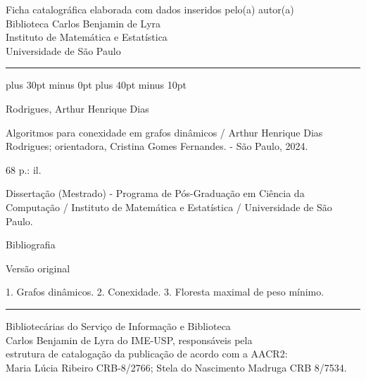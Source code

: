 \begingroup\centering\singlespacing\small
{}
Ficha catalográfica elaborada com dados inseridos pelo(a) autor(a)\\
Biblioteca Carlos Benjamin de Lyra\\
Instituto de Matemática e Estatística\\
Universidade de São Paulo\par
\vspace{2\baselineskip}\hrule\vspace{.8\baselineskip}
\RaggedRightRightskip 0pt plus 30pt minus 0pt\relax
\RaggedRightParfillskip 20pt plus 40pt minus 10pt\relax
\ttfamily\hspace{2em}\begin{minipage}[t]{125mm}
\RaggedRight\sloppy{}

\noindent Rodrigues, Arthur Henrique Dias

Algoritmos para conexidade em grafos dinâmicos / Arthur Henrique Dias Rodrigues; orientadora, Cristina Gomes Fernandes. - São Paulo, 2024.

68 p.: il.

\vspace{1\baselineskip}


\vspace{1\baselineskip}


Dissertação (Mestrado) - Programa de Pós-Graduação em Ciência da Computação / Instituto de Matemática e Estatística / Universidade de São Paulo.

Bibliografia

Versão original

\vspace{1\baselineskip}


\vspace{1\baselineskip}


1. Grafos dinâmicos. 2. Conexidade. 3. Floresta maximal de peso mínimo. 

\end{minipage}\par
\vspace{1\baselineskip}\hrule\vspace{.5\baselineskip}\rmfamily
Bibliotecárias do Serviço de Informação e Biblioteca\\
Carlos Benjamin de Lyra do IME-USP, responsáveis pela\\
estrutura de catalogação da publicação de acordo com a AACR2:\\
Maria Lúcia Ribeiro CRB-8/2766; Stela do Nascimento Madruga CRB 8/7534.
\par\endgroup
